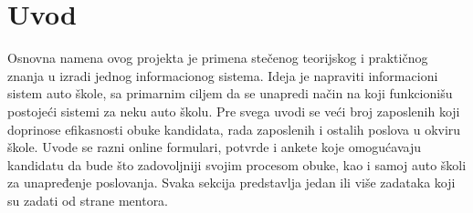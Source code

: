 \section{Uvod}
\label{sec:uvod}

Osnovna namena ovog projekta je primena stečenog teorijskog i praktičnog znanja u izradi jednog informacionog sistema. Ideja je napraviti informacioni sistem auto škole, sa primarnim ciljem da se unapredi način na koji funkcionišu postojeći sistemi za neku auto školu. Pre svega uvodi se veći broj zaposlenih koji doprinose efikasnosti obuke kandidata, rada zaposlenih i ostalih poslova u okviru škole. Uvode se razni online formulari, potvrde i ankete koje omogućavaju kandidatu da bude što zadovoljniji svojim procesom obuke, kao  i samoj auto školi za unapređenje poslovanja.
Svaka sekcija predstavlja jedan ili više zadataka koji su zadati od strane mentora.
